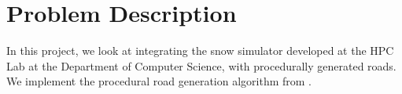 \chapter*{Problem Description}
In this project, we look at integrating the snow simulator developed at the HPC Lab at the Department of Computer Science, with procedurally generated roads. We implement the procedural road generation algorithm from \cite{pgor}.
